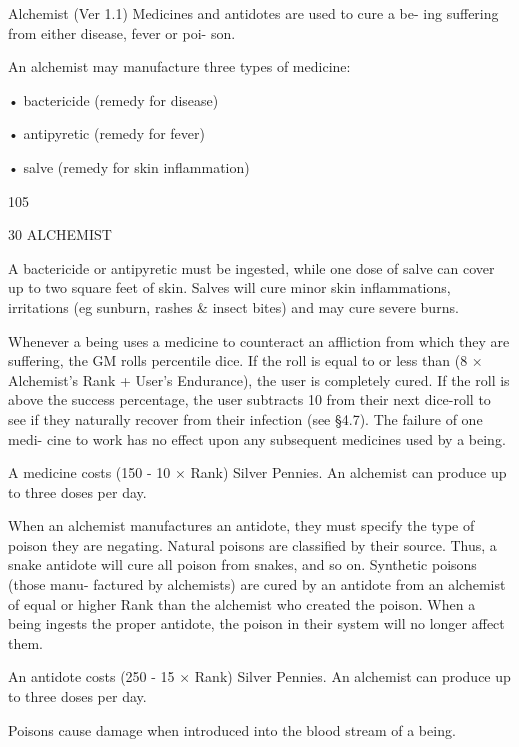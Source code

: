 \begin{Chapter}{Alchemist (Ver 1.1)}
Medicines  and  antidotes  are  used  to  cure  a  be-
ing  suffering  from  either  disease,  fever  or  poi-
son. 

An  alchemist  may  manufacture  three  types  of 
medicine:  

• bactericide (remedy for disease)  

• antipyretic (remedy for fever)  

• salve (remedy for skin inflammation) 

105 

30 ALCHEMIST 

A bactericide or antipyretic must be ingested, while 
one  dose  of  salve  can  cover  up  to  two  square  feet 
of skin. Salves will cure minor skin inflammations, 
irritations  (eg  sunburn,  rashes  \&  insect  bites)  and 
may cure severe burns. 

Whenever a being uses a medicine to counteract an 
affliction  from  which  they  are  suffering,  the  GM 
rolls  percentile  dice.  If  the  roll  is  equal  to  or  less 
than  (8  ×  Alchemist’s  Rank  +  User’s  Endurance), 
the user is completely cured. If the roll is above the 
success percentage, the user subtracts 10 from their 
next dice-roll to see if they naturally recover  from 
their infection (see §4.7). The failure of one medi-
cine  to  work  has  no  effect  upon  any  subsequent 
medicines used by a being. 

A medicine costs (150 - 10 × Rank) Silver Pennies. 
An  alchemist  can  produce  up  to  three  doses  per 
day. 

When an alchemist manufactures an antidote, they 
must  specify  the  type  of  poison  they  are  negating. 
Natural  poisons  are  classified  by  their  source. 
Thus,  a  snake  antidote  will  cure  all  poison  from 
snakes, and so on. Synthetic poisons (those manu-
factured  by  alchemists)  are  cured  by  an  antidote 
from an alchemist of equal or higher Rank than the 
alchemist  who  created  the  poison.  When  a  being 
ingests  the  proper  antidote,  the  poison  in  their 
system will no longer affect them. 

An antidote costs (250 - 15 × Rank) Silver Pennies. 
An  alchemist  can  produce  up  to  three  doses  per 
day. 

Poisons cause damage when introduced into the 
blood stream of a being. 


\end{Chapter}
